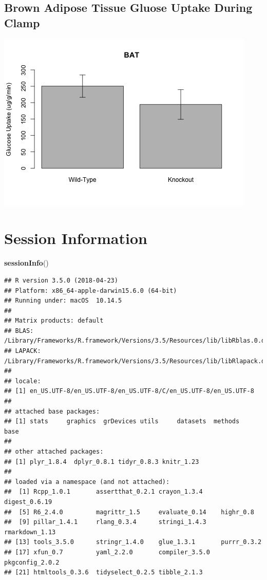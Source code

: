 \documentclass[]{article}
\newenvironment{Shaded}{\begin{snugshade}}{\end{snugshade}}
\newcommand{\KeywordTok}[1]{\textcolor[rgb]{0.13,0.29,0.53}{\textbf{#1}}}
\newcommand{\NormalTok}[1]{#1}
\begin{document}
\subsection{Brown Adipose Tissue Gluose Uptake During
Clamp}\label{brown-adipose-tissue-gluose-uptake-during-clamp}

\includegraphics{figures/bat-1.png}

\section{Session Information}\label{session-information}

\begin{Shaded}
\begin{Highlighting}[]
\KeywordTok{sessionInfo}\NormalTok{()}
\end{Highlighting}
\end{Shaded}

\begin{verbatim}
## R version 3.5.0 (2018-04-23)
## Platform: x86_64-apple-darwin15.6.0 (64-bit)
## Running under: macOS  10.14.5
## 
## Matrix products: default
## BLAS: /Library/Frameworks/R.framework/Versions/3.5/Resources/lib/libRblas.0.dylib
## LAPACK: /Library/Frameworks/R.framework/Versions/3.5/Resources/lib/libRlapack.dylib
## 
## locale:
## [1] en_US.UTF-8/en_US.UTF-8/en_US.UTF-8/C/en_US.UTF-8/en_US.UTF-8
## 
## attached base packages:
## [1] stats     graphics  grDevices utils     datasets  methods   base     
## 
## other attached packages:
## [1] plyr_1.8.4  dplyr_0.8.1 tidyr_0.8.3 knitr_1.23 
## 
## loaded via a namespace (and not attached):
##  [1] Rcpp_1.0.1       assertthat_0.2.1 crayon_1.3.4     digest_0.6.19   
##  [5] R6_2.4.0         magrittr_1.5     evaluate_0.14    highr_0.8       
##  [9] pillar_1.4.1     rlang_0.3.4      stringi_1.4.3    rmarkdown_1.13  
## [13] tools_3.5.0      stringr_1.4.0    glue_1.3.1       purrr_0.3.2     
## [17] xfun_0.7         yaml_2.2.0       compiler_3.5.0   pkgconfig_2.0.2 
## [21] htmltools_0.3.6  tidyselect_0.2.5 tibble_2.1.3
\end{verbatim}
\end{document}
